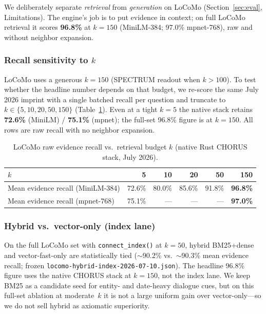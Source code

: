 \documentclass[11pt]{article}
\begin{document}
We deliberately separate \emph{retrieval} from \emph{generation} on LoCoMo
(Section~\ref{sec:eval}, Limitations). The engine's job is to put evidence in
context; on full LoCoMo retrieval it scores \textbf{96.8\%} at $k{=}150$
(MiniLM-384; 97.0\% mpnet-768), raw and without neighbor expansion.

\subsubsection{Recall sensitivity to $k$}
LoCoMo uses a generous $k{=}150$ (SPECTRUM readout when $k{>}100$). To test
whether the headline number depends on that budget, we re-score the same July 2026
imprint with a single batched recall per question and truncate to
$k \in \{5,10,20,50,150\}$ (Table~\ref{tab:locomo-k}). Even at a tight $k{=}5$ the
native stack retains \textbf{72.6\%} (MiniLM) / \textbf{75.1\%} (mpnet); the full-set
96.8\% figure is at $k{=}150$. All rows are raw recall with no neighbor expansion.

\begin{table}[h]
\centering
\caption{LoCoMo raw evidence recall vs.\ retrieval budget $k$ (native Rust CHORUS stack, July 2026).}
\label{tab:locomo-k}
\begin{tabular}{lrrrrr}
\toprule
$k$ & 5 & 10 & 20 & 50 & 150 \\
\midrule
Mean evidence recall (MiniLM-384) & 72.6\% & 80.0\% & 85.6\% & 91.8\% & \textbf{96.8\%} \\
Mean evidence recall (mpnet-768) & 75.1\% & --- & --- & --- & \textbf{97.0\%} \\
\bottomrule
\end{tabular}
\end{table}

\subsubsection{Hybrid vs.\ vector-only (index lane)}
On the full LoCoMo set with \texttt{connect\_index()} at $k{=}50$, hybrid
BM25+dense and vector-fast-only are statistically tied ($\sim$90.2\% vs.\
$\sim$90.3\% mean evidence recall; frozen
\texttt{locomo-hybrid-index-2026-07-10.json}). The headline 96.8\% figure uses
the native CHORUS stack at $k{=}150$, not the index lane. We keep BM25 as a candidate
seed for entity- and date-heavy dialogue cues, but on this full-set ablation at
moderate~$k$ it is not a large uniform gain over vector-only---so we do not sell
hybrid as axiomatic superiority.
\end{document}
